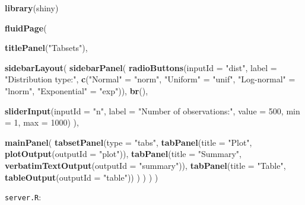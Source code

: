 \documentclass[]{book}
\newenvironment{Shaded}{\begin{snugshade}}{\end{snugshade}}
\newcommand{\KeywordTok}[1]{\textcolor[rgb]{0.13,0.29,0.53}{\textbf{{#1}}}}
\newcommand{\DataTypeTok}[1]{\textcolor[rgb]{0.13,0.29,0.53}{{#1}}}
\newcommand{\DecValTok}[1]{\textcolor[rgb]{0.00,0.00,0.81}{{#1}}}
\newcommand{\StringTok}[1]{\textcolor[rgb]{0.31,0.60,0.02}{{#1}}}
\newcommand{\NormalTok}[1]{{#1}}
\theoremstyle{definition}
\theoremstyle{definition}
\theoremstyle{remark}
\begin{document}
\begin{Shaded}
\begin{Highlighting}[]
\KeywordTok{library}\NormalTok{(shiny)}

\KeywordTok{fluidPage}\NormalTok{(}
    
  \KeywordTok{titlePanel}\NormalTok{(}\StringTok{"Tabsets"}\NormalTok{),}
  
  \KeywordTok{sidebarLayout}\NormalTok{(}
    \KeywordTok{sidebarPanel}\NormalTok{(}
      \KeywordTok{radioButtons}\NormalTok{(}\DataTypeTok{inputId =} \StringTok{"dist"}\NormalTok{, }
                   \DataTypeTok{label =} \StringTok{"Distribution type:"}\NormalTok{,}
                   \KeywordTok{c}\NormalTok{(}\StringTok{"Normal"} \NormalTok{=}\StringTok{ "norm"}\NormalTok{,}
                     \StringTok{"Uniform"} \NormalTok{=}\StringTok{ "unif"}\NormalTok{,}
                     \StringTok{"Log-normal"} \NormalTok{=}\StringTok{ "lnorm"}\NormalTok{,}
                     \StringTok{"Exponential"} \NormalTok{=}\StringTok{ "exp"}\NormalTok{)),}
      \KeywordTok{br}\NormalTok{(),}
      
      \KeywordTok{sliderInput}\NormalTok{(}\DataTypeTok{inputId =} \StringTok{"n"}\NormalTok{, }
                  \DataTypeTok{label =} \StringTok{"Number of observations:"}\NormalTok{, }
                   \DataTypeTok{value =} \DecValTok{500}\NormalTok{,}
                   \DataTypeTok{min =} \DecValTok{1}\NormalTok{, }
                   \DataTypeTok{max =} \DecValTok{1000}\NormalTok{)}
    \NormalTok{),}
    
    \KeywordTok{mainPanel}\NormalTok{(}
      \KeywordTok{tabsetPanel}\NormalTok{(}\DataTypeTok{type =} \StringTok{"tabs"}\NormalTok{, }
        \KeywordTok{tabPanel}\NormalTok{(}\DataTypeTok{title =} \StringTok{"Plot"}\NormalTok{, }\KeywordTok{plotOutput}\NormalTok{(}\DataTypeTok{outputId =} \StringTok{"plot"}\NormalTok{)), }
        \KeywordTok{tabPanel}\NormalTok{(}\DataTypeTok{title =} \StringTok{"Summary"}\NormalTok{, }\KeywordTok{verbatimTextOutput}\NormalTok{(}\DataTypeTok{outputId =} \StringTok{"summary"}\NormalTok{)), }
        \KeywordTok{tabPanel}\NormalTok{(}\DataTypeTok{title =} \StringTok{"Table"}\NormalTok{, }\KeywordTok{tableOutput}\NormalTok{(}\DataTypeTok{outputId =} \StringTok{"table"}\NormalTok{))}
      \NormalTok{)}
    \NormalTok{)}
  \NormalTok{)}
\NormalTok{)}
\end{Highlighting}
\end{Shaded}

\texttt{server.R}:
\end{document}
